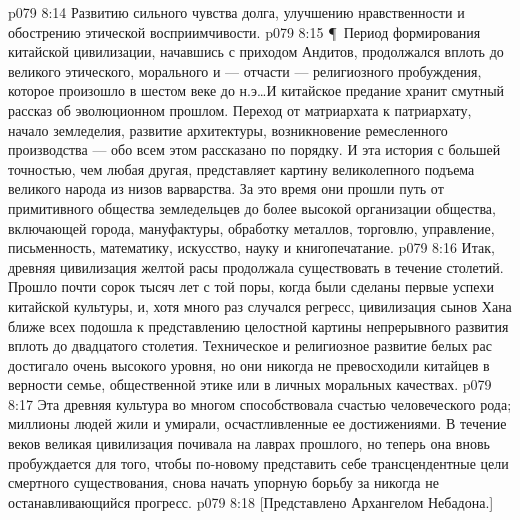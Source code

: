 \vs p079 8:14 \bibnobreakspace Развитию сильного чувства долга, улучшению нравственности и обострению этической восприимчивости.
\vs p079 8:15 \P\ Период формирования китайской цивилизации, начавшись с приходом Андитов, продолжался вплоть до великого этического, морального и --- отчасти --- религиозного пробуждения, которое произошло в шестом веке до н.э\ldots И китайское предание хранит смутный рассказ об эволюционном прошлом. Переход от матриархата к патриархату, начало земледелия, развитие архитектуры, возникновение ремесленного производства --- обо всем этом рассказано по порядку. И эта история с большей точностью, чем любая другая, представляет картину великолепного подъема великого народа из низов варварства. За это время они прошли путь от примитивного общества земледельцев до более высокой организации общества, включающей города, мануфактуры, обработку металлов, торговлю, управление, письменность, математику, искусство, науку и книгопечатание.
\vs p079 8:16 Итак, древняя цивилизация желтой расы продолжала существовать в течение столетий. Прошло почти сорок тысяч лет с той поры, когда были сделаны первые успехи китайской культуры, и, хотя много раз случался регресс, цивилизация сынов Хана ближе всех подошла к представлению целостной картины непрерывного развития вплоть до двадцатого столетия. Техническое и религиозное развитие белых рас достигало очень высокого уровня, но они никогда не превосходили китайцев в верности семье, общественной этике или в личных моральных качествах.
\vs p079 8:17 Эта древняя культура во многом способствовала счастью человеческого рода; миллионы людей жили и умирали, осчастливленные ее достижениями. В течение веков великая цивилизация почивала на лаврах прошлого, но теперь она вновь пробуждается для того, чтобы по\hyp{}новому представить себе трансцендентные цели смертного существования, снова начать упорную борьбу за никогда не останавливающийся прогресс.
\vs p079 8:18 [Представлено Архангелом Небадона.]
